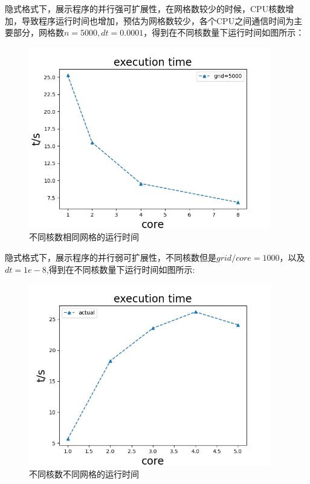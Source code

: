 \documentclass[
	20pt%
]{SUSTechHomework}
\begin{document}
\clearpage
\qquad  隐式格式下，展示程序的并行强可扩展性，在网格数较少的时候，CPU核数增加，导致程序运行时间也增加，预估为网格数较少，各个CPU之间通信时间为主要部分，网格数$n=5000,dt=0.0001$，得到在不同核数量下运行时间如图所示：
\begin{figure}[h]
    \centering
    \includegraphics[width=300pt]{img/Implicit_Exec.png}
    \caption{不同核数相同网格的运行时间}
    \label{fig:my_label}
\end{figure}

\qquad 隐式格式下，展示程序的并行弱可扩展性，不同核数但是$grid/core=1000$，以及$dt=1e-8$,得到在不同核数量下运行时间如图所示:
\begin{figure}[h]
    \centering
    \includegraphics[width=300pt]{img/Implicit_E.png}
    \caption{不同核数不同网格的运行时间}
    \label{fig:my_label}
\end{figure}
\clearpage
\end{document}
